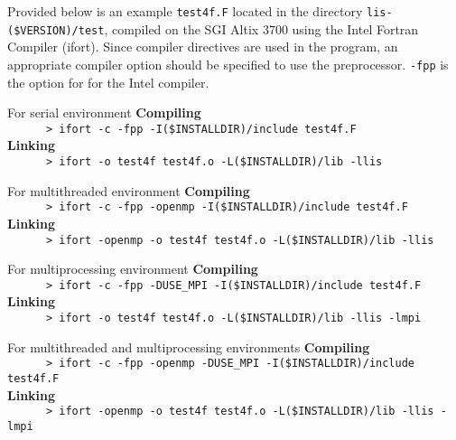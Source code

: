 \documentclass[a4paper]{article}
\begin{document}
Provided below is an example \verb|test4f.F| located 
in the directory \verb|lis-($VERSION)/test|, compiled on the SGI Altix 3700 
using the Intel Fortran Compiler (ifort). 
Since compiler directives are used in the program, 
an appropriate compiler option should be specified to use the preprocessor.
\verb|-fpp| is the option for for the Intel compiler. 

\begin{itemsquarebox}[l]{For serial environment}
\small
{\bf Compiling}\\
\verb+      > ifort -c -fpp -I($INSTALLDIR)/include test4f.F+\\
{\bf Linking}\\
\verb+      > ifort -o test4f test4f.o -L($INSTALLDIR)/lib -llis+\\
\end{itemsquarebox}
\begin{itemsquarebox}[l]{For multithreaded environment}
\small
{\bf Compiling}\\
\verb+      > ifort -c -fpp -openmp -I($INSTALLDIR)/include test4f.F+\\
{\bf Linking}\\
\verb+      > ifort -openmp -o test4f test4f.o -L($INSTALLDIR)/lib -llis+\\
\end{itemsquarebox}
\begin{itemsquarebox}[l]{For multiprocessing environment}
\small
{\bf Compiling}\\
\verb+      > ifort -c -fpp -DUSE_MPI -I($INSTALLDIR)/include test4f.F+\\
{\bf Linking}\\
\verb+      > ifort -o test4f test4f.o -L($INSTALLDIR)/lib -llis -lmpi+\\
\end{itemsquarebox}
\begin{itemsquarebox}[l]{For multithreaded and multiprocessing environments}
\small
{\bf Compiling}\\
\verb+      > ifort -c -fpp -openmp -DUSE_MPI -I($INSTALLDIR)/include test4f.F+\\
{\bf Linking}\\
\verb+      > ifort -openmp -o test4f test4f.o -L($INSTALLDIR)/lib -llis -lmpi+\\
\end{itemsquarebox}
\end{document}

